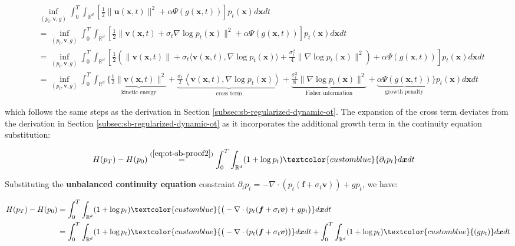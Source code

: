 \documentclass{article}
\newcommand{\bluetext}[1]{\textcolor{customblue}{#1}}
\begin{document}
\begin{small}
\begin{align}
    &\inf_{(p_t, \boldsymbol{v}, g)}\int_0^T\int_{\mathbb{R}^d}\left[\frac{1}{2}\|\boldsymbol{u}(\boldsymbol{x},t)\|^2+\alpha\Psi(g(\boldsymbol{x},t))\right]p_t(\boldsymbol{x})d\boldsymbol{x}dt\nonumber\\
    &=\inf_{(p_t, \boldsymbol{v}, g)}\int_0^T\int_{\mathbb{R}^d}\left[\frac{1}{2}\bigg\|\boldsymbol{v}(\boldsymbol{x},t)+\sigma_t\nabla \log  p_t(\boldsymbol{x})\bigg\|^2+\alpha\Psi(g(\boldsymbol{x},t))\right]p_t(\boldsymbol{x})d\boldsymbol{x}dt\nonumber\\
    &=\inf_{(p_t, \boldsymbol{v}, g)}\int_0^T\int_{\mathbb{R}^d}\left[\frac{1}{2}\left(\|\boldsymbol{v}(\boldsymbol{x},t)\|+\sigma_t\langle \boldsymbol{v}(\boldsymbol{x},t),\nabla \log  p_t(\boldsymbol{x})\rangle + \frac{\sigma_t^2}{4}\|\nabla \log  p_t(\boldsymbol{x})\|^2\right)+\alpha\Psi(g(\boldsymbol{x},t))\right]p_t(\boldsymbol{x})d\boldsymbol{x}dt\nonumber\\
    &=\inf_{(p_t, \boldsymbol{v}, g)}\int_0^T\int_{\mathbb{R}^d}\bigg\{\underbrace{\frac{1}{2}\|\boldsymbol{v}(\boldsymbol{x},t)\|^2 }_{\text{kinetic energy}}+\underbrace{\frac{\sigma_t}{2}\left\langle\boldsymbol{v}(\boldsymbol{x},t), \nabla \log p_t(\boldsymbol{x})\right \rangle}_{\text{cross term}}+\underbrace{\frac{\sigma_t^2}{8}\|\nabla \log  p_t(\boldsymbol{x})\|^2}_{\text{Fisher information}} +\underbrace{\alpha\Psi(g(\boldsymbol{x},t))}_{\text{growth penalty}}\bigg\}p_t(\boldsymbol{x})d\boldsymbol{x}dt\label{eq:unbalanced-proof-2}
\end{align}
\end{small}
which follows the same steps as the derivation in Section \ref{subsec:sb-regularized-dynamic-ot}. The expansion of the cross term deviates from the derivation in Section \ref{subsec:sb-regularized-dynamic-ot} as it incorporates the additional growth term in the continuity equation substitution:
\begin{small}
\begin{align}
    H(p_T)-H(p_0)&\overset{(\ref{eq:ot-sb-proof2})}{=}\int_0^T\int_{\mathbb{R}^d}(1+\log p_t)\bluetext{\partial_tp_t}d\boldsymbol{x}dt
\end{align}
\end{small}
Substituting the \textbf{unbalanced continuity equation} constraint $\partial_tp_t=-\nabla\cdot(p_t(\boldsymbol{f}+\sigma_t\boldsymbol{v}))+gp_t$, we have:
\begin{small}
\begin{align}
    H(p_T)-H(p_0)
    &=\int_0^T\int_{\mathbb{R}^d}(1+\log p_t)\bluetext{\big(-\nabla\cdot(p_t(\boldsymbol{f}+\sigma_t\boldsymbol{v})+gp_t\big)}d\boldsymbol{x}dt\nonumber\\
    &=\int_0^T\int_{\mathbb{R}^d}(1+\log p_t)\bluetext{\big(-\nabla\cdot(p_t(\boldsymbol{f}+\sigma_t\boldsymbol{v})\big)}d\boldsymbol{x}dt+\int_0^T\int_{\mathbb{R}^d}(1+\log p_t)\bluetext{(gp_t)}d\boldsymbol{x}dt
\end{align}
\end{small}
\end{document}
